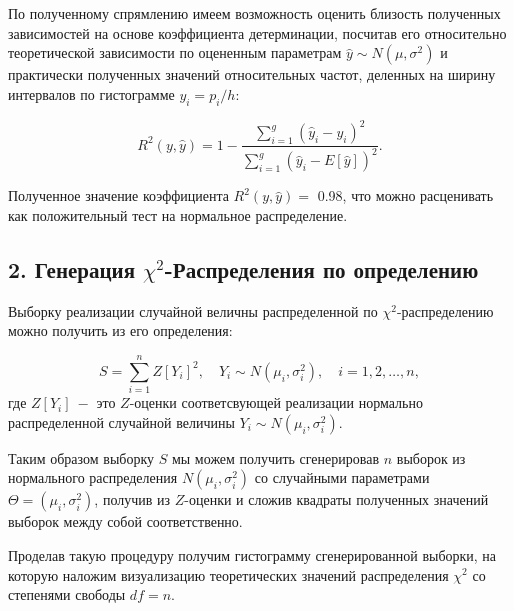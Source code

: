 \documentclass[
]{article}
\begin{document}
По полученному спрямлению имеем возможность оценить близость полученных
зависимостей на основе коэффициента детерминации, посчитав его
относительно теоретической зависимости по оцененным параметрам
\(\hat{y} \sim N(\mu, \sigma^2)\) и практически полученных значений
относительных частот, деленных на ширину интервалов по гистограмме
\(y_i = p_i / h\):

\[
R^2(y, \hat{y}) = 1 - \frac{\sum \limits_{i=1}^{g} (\hat{y}_i - y_i)^2}{\sum \limits_{i=1}^{g} (\hat{y}_i - E[\hat{y}])^2}.
\]

Полученное значение коэффициента \(R^2(y, \hat{y})=\) 0.98, что можно
расценивать как положительный тест на нормальное распределение.

\hypertarget{ux433ux435ux43dux435ux440ux430ux446ux438ux44f-chi2-ux440ux430ux441ux43fux440ux435ux434ux435ux43bux435ux43dux438ux44f-ux43fux43e-ux43eux43fux440ux435ux434ux435ux43bux435ux43dux438ux44e}{%
\subsection{\texorpdfstring{\textbf{2. Генерация
\(\chi^2\)-Распределения по
определению}}{2. Генерация \textbackslash chi\^{}2-Распределения по определению}}\label{ux433ux435ux43dux435ux440ux430ux446ux438ux44f-chi2-ux440ux430ux441ux43fux440ux435ux434ux435ux43bux435ux43dux438ux44f-ux43fux43e-ux43eux43fux440ux435ux434ux435ux43bux435ux43dux438ux44e}}

Выборку реализации случайной величны распределенной по
\(\chi^2\)-распределению можно получить из его определения:

\[
S = \sum_{i=1}^{n} Z[Y_i]^2,\quad  Y_i \sim N(\mu_i, \sigma_i^2), \quad i=1,2,\dots,n,
\] где \(Z[Y_i]\ -\) это \(Z\)-оценки соответсвующей реализации
нормально распределенной случайной величины
\(Y_i \sim N(\mu_i, \sigma_i^2)\).

Таким образом выборку \(S\) мы можем получить сгенерировав \(n\) выборок
из нормального распределения \(N(\mu_i, \sigma_i^2)\) со случайными
параметрами \(\Theta = (\mu_i, \sigma_i^2)\), получив из \(Z\)-оценки и
сложив квадраты полученных значений выборок между собой соответственно.

Проделав такую процедуру получим гистограмму сгенерированной выборки, на
которую наложим визуализацию теоретических значений распределения
\(\chi^2\) со степенями свободы \(df = n\).
\end{document}
